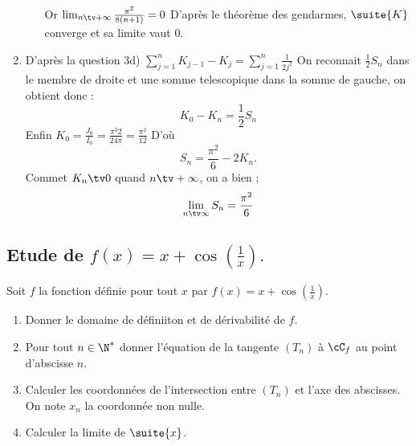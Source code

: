 \begin{correction}
\begin{enumerate}
\begin{enumerate}
Or $\lim_{n\tv +\infty}  \frac{\pi^2}{8(n+1)} =0$ 
D'après le théorème des gendarmes, $\suite{K}$ converge et sa limite vaut $0$. 

\end{enumerate}
\item D'après la question 3d)  $\sum_{j=1}^n  K_{j-1} -K_j =\sum_{j=1}^n \frac{1}{2 j^2}$
On reconnait $\frac{1}{2}S_n$ dans le membre de droite et une somme telescopique dans la somme de gauche, on obtient donc : 
$$K_{0}-K_n =\frac{1}{2} S_n$$
Enfin $K_0 =\frac{J_0}{I_0} = \frac{\pi^3 2}{24 \pi} = \frac{\pi^2}{12}$
D'où 
$$S_n = \frac{\pi^2}{6} -2K_n.$$
Commet $K_n\tv 0$ quand $n\tv +\infty$, on  a bien ; 
$$ \lim_{n\tv \infty} S_n  =\frac{\pi^2}{6}$$




\end{enumerate}
\end{correction}




\subsection{Etude de $f(x) = x+\cos\left(\frac{1}{x}\right).$}


\begin{exercice}
Soit $f$ la fonction définie pour tout $x$ par $f(x) = x+\cos\left(\frac{1}{x}\right).$
\begin{enumerate}
\item Donner le domaine de définiiton et de dérivabilité de $f$. 
\item Pour tout $n\in\N^* $ donner l'équation de la tangente 
$(T_n)$ à $\cC_f$ au point d'abscisse $n$. 
\item Calculer les coordonnées de  l'intersection entre $(T_n)$ et l'axe des abscisses. On note $x_n$ la coordonnée non nulle. 
\item Calculer la limite de $\suite{x}$. 
\end{enumerate}
\end{exercice}

